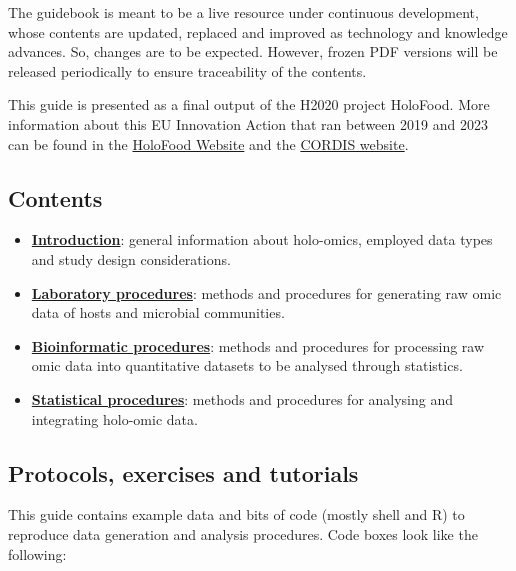\documentclass[
]{book}
\providecommand{\tightlist}{%
  \setlength{\itemsep}{0pt}\setlength{\parskip}{0pt}}
\begin{document}
The guidebook is meant to be a live resource under continuous development, whose contents are updated, replaced and improved as technology and knowledge advances. So, changes are to be expected. However, frozen PDF versions will be released periodically to ensure traceability of the contents.

This guide is presented as a final output of the H2020 project HoloFood. More information about this EU Innovation Action that ran between 2019 and 2023 can be found in the \href{http://www.holofood.eu}{HoloFood Website} and the \href{https://cordis.europa.eu/project/id/817729}{CORDIS website}.

\hypertarget{contents}{%
\subsection*{Contents}\label{contents}}

\begin{itemize}
\tightlist
\item
  \textbf{\protect\hyperlink{holo-omics}{Introduction}}: general information about holo-omics, employed data types and study design considerations.
\item
  \textbf{\protect\hyperlink{about-labwork}{Laboratory procedures}}: methods and procedures for generating raw omic data of hosts and microbial communities.
\item
  \textbf{\protect\hyperlink{about-bioinformatics}{Bioinformatic procedures}}: methods and procedures for processing raw omic data into quantitative datasets to be analysed through statistics.
\item
  \textbf{\protect\hyperlink{about-statistics}{Statistical procedures}}: methods and procedures for analysing and integrating holo-omic data.
\end{itemize}

\hypertarget{protocols-exercises-tutorials}{%
\subsection*{Protocols, exercises and tutorials}\label{protocols-exercises-tutorials}}

This guide contains example data and bits of code (mostly shell and R) to reproduce data generation and analysis procedures. Code boxes look like the following:
\end{document}
